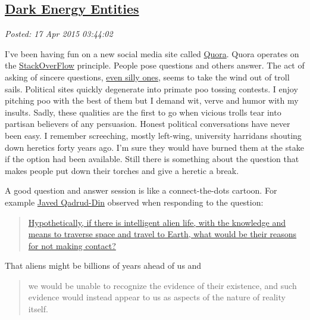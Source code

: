 %

\subsection*{\href{https://bakerjd99.wordpress.com/2015/04/16/dark-energy-entities/}{Dark Energy Entities}}


\noindent\emph{Posted: 17 Apr 2015 03:44:02}
\vspace{6pt}

I've been having fun on a new social media site called
\href{http://www.quora.com/John-Baker-98}{Quora}. Quora operates on the
\href{http://stackoverflow.com/}{StackOverFlow} principle. People pose
questions and others answer. The act of asking of sincere questions,
\href{http://www.quora.com/How-would-the-world-change-if-prairie-dogs-spontaneously-became-super-intelligent-but-only-the-French-knew-about-it}{even
silly ones}, seems to take the wind out of troll sails. Political sites
quickly degenerate into primate poo tossing contests. I enjoy pitching
poo with the best of them but I demand wit, verve and humor with my
insults. Sadly, these qualities are the first to go when vicious trolls
tear into partisan believers of any persuasion. Honest political
conversations have never been easy. I remember screeching, mostly
left-wing, university harridans shouting down heretics forty years ago.
I'm sure they would have burned them at the stake if the option had been
available. Still there is something about the question that makes people
put down their torches and give a heretic a break.

A good question and answer session is like a connect-the-dots cartoon.
For example \href{http://www.quora.com/Javed-Qadrud-Din}{Javed
Qadrud-Din} observed when responding to the question:

\begin{quote}
\href{http://www.quora.com/Hypothetically-if-there-is-intelligent-alien-life-with-the-knowledge-and-means-to-traverse-space-and-travel-to-Earth-what-would-be-their-reasons-for-not-making-contact-Please-read-details}{Hypothetically,
if there is intelligent alien life, with the knowledge and means to
traverse space and travel to Earth, what would be their reasons for not
making contact?}
\end{quote}

\noindent That aliens might be billions of years ahead of us and

\begin{quote}
we would be unable to recognize the evidence of their existence, and
such evidence would instead appear to us as aspects of the nature of
reality itself.
\end{quote}

